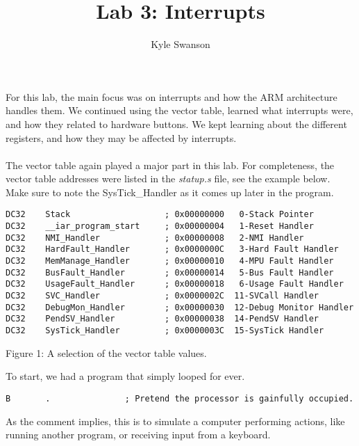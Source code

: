 \documentclass[12pt,a4paper]{report}
\author{Kyle Swanson}
\title{Lab 3: Interrupts }
\begin{document}
\maketitle

\paragraph{}
For this lab, the main focus was on interrupts and how the ARM architecture handles them. We continued using the vector table, learned what interrupts were, and how they related to hardware buttons. We kept learning about the different registers, and how they may be affected by interrupts. 

\paragraph{}
The vector table again played a major part in this lab. For completeness, the vector table addresses were listed in the \textit{statup.s} file, see the example below. Make sure to note the SysTick\_Handler as it comes up later in the program. 

\medskip

\lstset{language=[x86masm]Assembler}
\begin{lstlisting}
DC32    Stack                   ; 0x00000000   0-Stack Pointer
DC32    __iar_program_start     ; 0x00000004   1-Reset Handler
DC32    NMI_Handler             ; 0x00000008   2-NMI Handler
DC32    HardFault_Handler       ; 0x0000000C   3-Hard Fault Handler
DC32    MemManage_Handler       ; 0x00000010   4-MPU Fault Handler
DC32    BusFault_Handler        ; 0x00000014   5-Bus Fault Handler
DC32    UsageFault_Handler      ; 0x00000018   6-Usage Fault Handler
DC32    SVC_Handler             ; 0x0000002C  11-SVCall Handler
DC32    DebugMon_Handler        ; 0x00000030  12-Debug Monitor Handler
DC32    PendSV_Handler          ; 0x00000038  14-PendSV Handler
DC32    SysTick_Handler         ; 0x0000003C  15-SysTick Handler

\end{lstlisting}	
\begin{center}
\small{Figure 1: A selection of the vector table values.}
\end{center}

To start, we had a program that simply looped for ever. 
\lstset{language=[x86masm]Assembler}
\begin{lstlisting}
B       .               ; Pretend the processor is gainfully occupied.
\end{lstlisting}	
As the comment implies, this is to simulate a computer performing actions, like running another program, or receiving input from a keyboard. 
\end{document}

